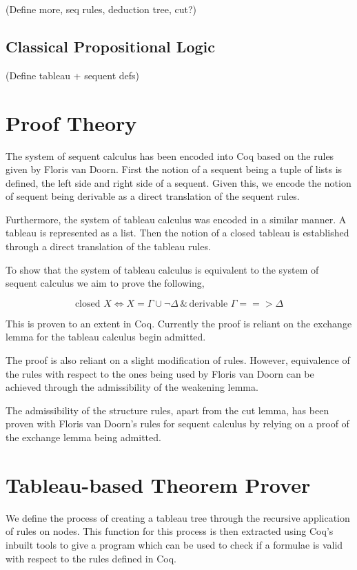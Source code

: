(Define more, seq rules, deduction tree, cut?)

\subsection{Classical Propositional Logic}

(Define tableau + sequent defs)

\section{Proof Theory}

The system of sequent calculus has been encoded into Coq based on the rules
given by Floris van Doorn. First the notion of a sequent being a tuple of lists
is defined, the left side and right side of a sequent. Given this, we encode
the notion of sequent being derivable as a direct translation of the sequent
rules.

Furthermore, the system of tableau calculus was encoded in a similar manner.
A tableau is represented as a list. Then the notion of a closed tableau is
established through a direct translation of the tableau rules.

To show that the system of tableau calculus is equivalent to the system of
sequent calculus we aim to prove the following,

\begin{equation}
\text{closed }X \iff X=\Gamma \cup \neg \Delta \, \& \, \text{derivable }
\Gamma ==> \Delta
\label{tableau sequent equivalence}
\end{equation}

This is proven to an extent in Coq. Currently the proof is reliant on the
exchange lemma for the tableau calculus begin admitted.

The proof is also reliant on a slight modification of rules. However,
equivalence of the rules with respect to the ones being used by Floris van
Doorn can be achieved through the admissibility of the weakening lemma.

The admissibility of the structure rules, apart from the cut lemma, has been
proven with Floris van Doorn's rules for sequent calculus by relying on a
proof of the exchange lemma being admitted.

\section{Tableau-based Theorem Prover}

We define the process of creating a tableau tree through the recursive
application of rules on nodes. This function for this process is then extracted
using Coq's inbuilt tools to give a program which can be used to check if a
formulae is valid with respect to the rules defined in Coq.

